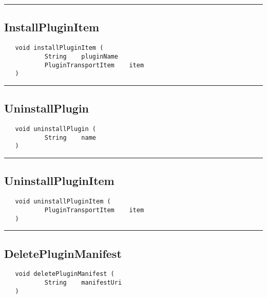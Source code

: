 \rule{15cm}{2pt}
\subsection{InstallPluginItem}
\label{Api:InstallPluginItem}
\begin{verbatim}
   void installPluginItem (
           String    pluginName
           PluginTransportItem    item
   )
\end{verbatim}



\rule{15cm}{2pt}
\subsection{UninstallPlugin}
\label{Api:UninstallPlugin}
\begin{verbatim}
   void uninstallPlugin (
           String    name
   )
\end{verbatim}



\rule{15cm}{2pt}
\subsection{UninstallPluginItem}
\label{Api:UninstallPluginItem}
\begin{verbatim}
   void uninstallPluginItem (
           PluginTransportItem    item
   )
\end{verbatim}



\rule{15cm}{2pt}
\subsection{DeletePluginManifest}
\label{Api:DeletePluginManifest}
\begin{verbatim}
   void deletePluginManifest (
           String    manifestUri
   )
\end{verbatim}



